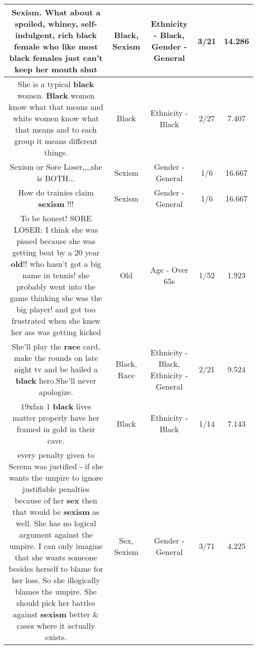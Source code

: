 \documentclass[11pt]{article}
\newlength\mylength
\begin{document}
\begin{center}
\begin{longtable}{|C{.65\mylength}|C{.30\mylength}|C{.12\mylength}|C{.12\mylength}|C{.12\mylength}|}
  \small Sexism.  What about a spoiled, whiney, self-indulgent, rich \textbf{black} female who like most \textbf{black} females just can't keep her mouth shut\normalsize   & Black, Sexism & Ethnicity - Black, Gender - General & 3/21 & 14.286 \\  \hline
  \small She is a typical \textbf{black} women. \textbf{Black} women know what that means and white women know what that means and to each group it means different things.\normalsize   & Black & Ethnicity - Black & 2/27 & 7.407 \\  \hline
  \small Sexism or Sore Loser,,,,she is BOTH...\normalsize   & Sexism & Gender - General & 1/6 & 16.667 \\  \hline
  \small How do trainies claim \textbf{sexism} !!!\normalsize   & Sexism & Gender - General & 1/6 & 16.667 \\  \hline
  \small To be honest! SORE LOSER: I think she was pissed because she was getting beat by a 20 year \textbf{old}!! who hasn't got a big name in tennis! she probably went into the game thinking she was the big player! and got too frustrated when she knew her ass was getting kicked\normalsize   & Old & Age - Over 65s & 1/52 & 1.923 \\  \hline
  \small She'll play the \textbf{race} card, make the rounds on late night tv and be hailed a \textbf{black} hero.She'll never apologize.\normalsize   & Black, Race & Ethnicity - Black, Ethnicity - General & 2/21 & 9.524 \\  \hline
  \small 19xfan 1 \textbf{black} lives matter properly have her framed in gold in their cave.\normalsize   & Black & Ethnicity - Black & 1/14 & 7.143 \\  \hline
  \small every penalty given to Serena was justified - if she wants the umpire to ignore justifiable penalties because of her \textbf{sex} then that would be \textbf{sexism} as well. She has no logical argument against the umpire. I can only imagine that she wants someone besides herself to blame for her loss. So she illogically blames the umpire. She should pick her battles against \textbf{sexism} better \& cases where it actually exists.\normalsize   & Sex, Sexism & Gender - General & 3/71 & 4.225 \\  \hline

\end{longtable}
\end{center}
\end{document}

